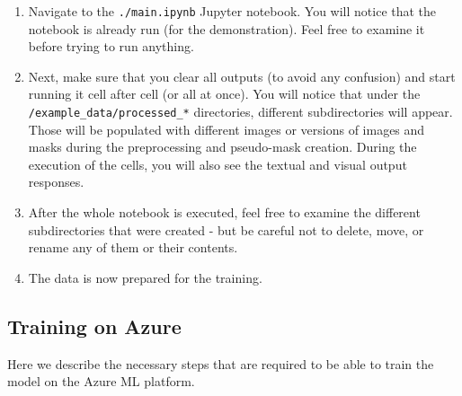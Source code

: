\begin{enumerate}
\item
  Navigate to the \texttt{./main.ipynb} Jupyter notebook.
  You will notice that the notebook is already run (for the
  demonstration). Feel free to examine it before trying to run anything.
\item
  Next, make sure that you clear all outputs (to avoid any confusion)
  and start running it cell after cell (or all at once). You will notice
  that under the \texttt{/example\_data/processed\_*} directories,
  different subdirectories will appear. Those will be populated with
  different images or versions of images and masks during the
  preprocessing and pseudo-mask creation. During the execution of the
  cells, you will also see the textual and visual output responses.
\item
  After the whole notebook is executed, feel free to examine the different
  subdirectories that were created - but be careful not to delete, move,
  or rename any of them or their contents.
\item
  The data is now prepared for the training.
\end{enumerate}

\subsection{Training on Azure}\label{a-training-on-azure}

Here we describe the necessary steps that are required to be
able to train the model on the Azure ML platform.

